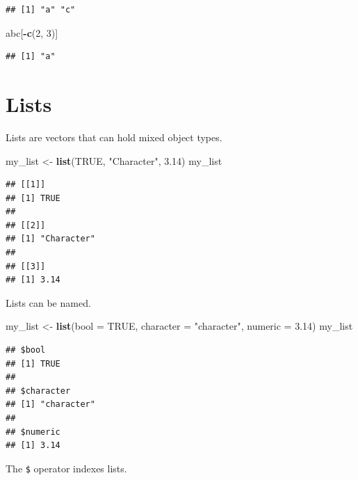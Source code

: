\documentclass[openany]{book}
\newenvironment{Shaded}{\begin{snugshade}}{\end{snugshade}}
\newcommand{\DataTypeTok}[1]{\textcolor[rgb]{0.13,0.29,0.53}{#1}}
\newcommand{\DecValTok}[1]{\textcolor[rgb]{0.00,0.00,0.81}{#1}}
\newcommand{\FloatTok}[1]{\textcolor[rgb]{0.00,0.00,0.81}{#1}}
\newcommand{\KeywordTok}[1]{\textcolor[rgb]{0.13,0.29,0.53}{\textbf{#1}}}
\newcommand{\NormalTok}[1]{#1}
\newcommand{\OperatorTok}[1]{\textcolor[rgb]{0.81,0.36,0.00}{\textbf{#1}}}
\newcommand{\OtherTok}[1]{\textcolor[rgb]{0.56,0.35,0.01}{#1}}
\newcommand{\StringTok}[1]{\textcolor[rgb]{0.31,0.60,0.02}{#1}}
\begin{document}
\begin{verbatim}
## [1] "a" "c"
\end{verbatim}

\begin{Shaded}
\begin{Highlighting}[]
\NormalTok{abc[}\OperatorTok{-}\KeywordTok{c}\NormalTok{(}\DecValTok{2}\NormalTok{, }\DecValTok{3}\NormalTok{)]}
\end{Highlighting}
\end{Shaded}

\begin{verbatim}
## [1] "a"
\end{verbatim}

\hypertarget{lists}{%
\section{Lists}\label{lists}}

Lists are vectors that can hold mixed object types.

\begin{Shaded}
\begin{Highlighting}[]
\NormalTok{my_list <-}\StringTok{ }\KeywordTok{list}\NormalTok{(}\OtherTok{TRUE}\NormalTok{, }\StringTok{"Character"}\NormalTok{, }\FloatTok{3.14}\NormalTok{)}
\NormalTok{my_list}
\end{Highlighting}
\end{Shaded}

\begin{verbatim}
## [[1]]
## [1] TRUE
## 
## [[2]]
## [1] "Character"
## 
## [[3]]
## [1] 3.14
\end{verbatim}

Lists can be named.

\begin{Shaded}
\begin{Highlighting}[]
\NormalTok{my_list <-}\StringTok{ }\KeywordTok{list}\NormalTok{(}\DataTypeTok{bool =} \OtherTok{TRUE}\NormalTok{, }\DataTypeTok{character =} \StringTok{"character"}\NormalTok{, }\DataTypeTok{numeric =} \FloatTok{3.14}\NormalTok{)}
\NormalTok{my_list}
\end{Highlighting}
\end{Shaded}

\begin{verbatim}
## $bool
## [1] TRUE
## 
## $character
## [1] "character"
## 
## $numeric
## [1] 3.14
\end{verbatim}

The \texttt{\$} operator indexes lists.
\end{document}
